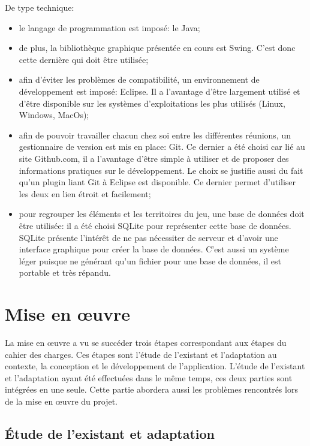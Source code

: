 \documentclass[a4paper, 11pt]{article}
\begin{document}
		De type technique:
		\begin{itemize}
			\item le langage de programmation est imposé: le Java;
			\item de plus, la bibliothèque graphique présentée en cours est Swing. C'est donc cette dernière qui doit être utilisée;
			\item afin d'éviter les problèmes de compatibilité, un environnement de développement est imposé: Eclipse. Il a l'avantage d'être largement utilisé et d'être disponible sur les systèmes d'exploitations les plus utilisés (Linux, Windows, MacOs);
			\item afin de pouvoir travailler chacun chez soi entre les différentes réunions, un gestionnaire de version est mis en place: Git. Ce dernier a été choisi car lié au site Github.com, il a l'avantage d'être simple à utiliser et de proposer des informations pratiques sur le développement. Le choix se justifie aussi du fait qu'un plugin liant Git à Eclipse est disponible. Ce dernier permet d'utiliser les deux en lien étroit et facilement;
			\item pour regrouper les éléments et les territoires du jeu, une base de données doit être utilisée: il a été choisi SQLite pour représenter cette base de données. SQLite présente l'intérêt de ne pas nécessiter de serveur et d'avoir une interface graphique pour créer la base de données. C'est aussi un système léger puisque ne générant qu'un fichier pour une base de données, il est portable et très répandu.
		\end{itemize}
		
	\section{Mise en œuvre}
	
		La mise en œuvre a vu se succéder trois étapes correspondant aux étapes du cahier des charges. Ces étapes sont l'étude de l'existant et l'adaptation au contexte, la conception et le développement de l'application. L'étude de l'existant et l'adaptation ayant été effectuées dans le même temps, ces deux parties sont intégrées en une seule. Cette partie abordera aussi les problèmes rencontrés lors de la mise en œuvre du projet.
		
		\subsection{Étude de l'existant et adaptation}
		
\end{document}
